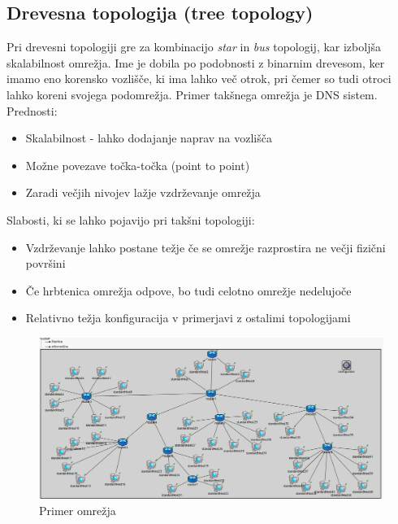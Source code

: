 \documentclass[11pt,a4paper,slovene]{myarticle}
\begin{document}
\subsection{Drevesna topologija (tree topology)}
Pri drevesni topologiji gre za kombinacijo \textit{star} in \textit{bus} topologij, kar izboljša skalabilnost omrežja. Ime je dobila po podobnosti z binarnim drevesom, ker imamo eno korensko vozlišče, ki ima lahko več otrok, pri čemer so tudi otroci lahko koreni svojega podomrežja. Primer takšnega omrežja je DNS sistem.\\
Prednosti:
\begin{itemize}
\item Skalabilnost - lahko dodajanje naprav na vozlišča
\item Možne povezave točka-točka (point to point)
\item Zaradi večjih nivojev lažje vzdrževanje omrežja 
\end{itemize}
Slabosti, ki se lahko pojavijo pri takšni topologiji:
\begin{itemize}
\item Vzdrževanje lahko postane težje če se omrežje razprostira ne večji fizični površini
\item Če hrbtenica omrežja odpove, bo tudi celotno omrežje nedelujoče
\item Relativno težja konfiguracija v primerjavi z ostalimi topologijami
\end{itemize}
\begin{figure}[H]
\includegraphics[scale=0.5]{slike/ipv6tree.png}
\caption{Primer omrežja}
\end{figure}


\pagebreak


\end{document}
